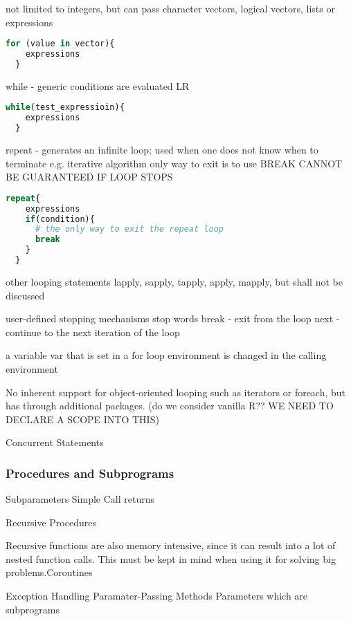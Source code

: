 \documentclass[12pt]{article}
\begin{document}
not limited to integers, but can pass character vectors, logical vectors, lists or expressions

\begin{lstlisting}[language=R]
  for (value in vector){
    expressions
  }
\end{lstlisting}



while - generic
conditions are evaluated LR

\begin{lstlisting}[language=R]
  while(test_expressioin){
    expressions
  }
\end{lstlisting}

repeat - generates an infinite loop; used when one does not know when to terminate e.g. iterative algorithm
only way to exit is to use BREAK
CANNOT BE GUARANTEED IF LOOP STOPS

\begin{lstlisting}[language=R]
  repeat{
    expressions
    if(condition){
      # the only way to exit the repeat loop
      break
    }
  }
\end{lstlisting}


other looping statements
lapply, sapply, tapply, apply, mapply, but shall not be discussed

user-defined stopping mechanisms
stop words
break - exit from the loop
next - continue to the next iteration of the loop

a variable var that is set in a for loop environment is changed in the calling environment

No inherent support for object-oriented looping such as iterators or foreach, but has through additional packages. (do we consider vanilla R?? WE NEED TO DECLARE A SCOPE INTO THIS)


Concurrent Statements


\subsubsection{Procedures and Subprograms}
Subparameters
Simple Call returns

Recursive Procedures

Recursive functions are also memory intensive, since it can result into a lot of nested function calls. This must be kept in mind when using it for solving big problems.Coroutines

Exception Handling
Paramater-Passing Methods
Parameters which are subprograms
\end{document}

